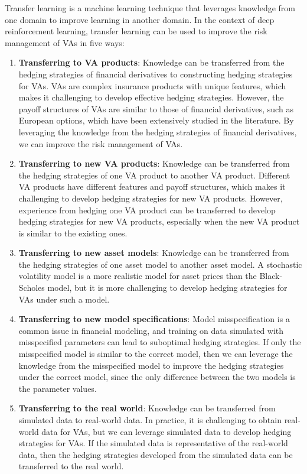 Transfer learning is a machine learning technique that leverages knowledge from one domain to improve learning in another domain.
In the context of deep reinforcement learning, transfer learning can be used to improve the risk management of VAs in five ways:
\begin{enumerate}
    \item   \textbf{Transferring to VA products}: Knowledge can be transferred from the hedging strategies of financial derivatives to constructing hedging strategies for VAs.
    VAs are complex insurance products with unique features, which makes it challenging to develop effective hedging strategies.
    However, the payoff structures of VAs are similar to those of financial derivatives, such as European options, which have been extensively studied in the literature.
    By leveraging the knowledge from the hedging strategies of financial derivatives, we can improve the risk management of VAs.
    \item   \textbf{Transferring to new VA products}: Knowledge can be transferred from the hedging strategies of one VA product to another VA product.
    Different VA products have different features and payoff structures, which makes it challenging to develop hedging strategies for new VA products.
    However, experience from hedging one VA product can be transferred to develop hedging strategies for new VA products, especially when the new VA product is similar to the existing ones.
    \item   \textbf{Transferring to new asset models}: Knowledge can be transferred from the hedging strategies of one asset model to another asset model.
    A stochastic volatility model is a more realistic model for asset prices than the Black-Scholes model, but it is more challenging to develop hedging strategies for VAs under such a model.
    \item  \textbf{Transferring to new model specifications}: Model misspecification is a common issue in financial modeling, and training on data simulated with misspecified parameters can lead to suboptimal hedging strategies.
    If only the misspecified model is similar to the correct model, then we can leverage the knowledge from the misspecified model to improve the hedging strategies under the correct model, since the only difference between the two models is the parameter values. 
    \item   \textbf{Transferring to the real world}: Knowledge can be transferred from simulated data to real-world data.
    In practice, it is challenging to obtain real-world data for VAs, but we can leverage simulated data to develop hedging strategies for VAs.
    If the simulated data is representative of the real-world data, then the hedging strategies developed from the simulated data can be transferred to the real world.

\end{enumerate}

